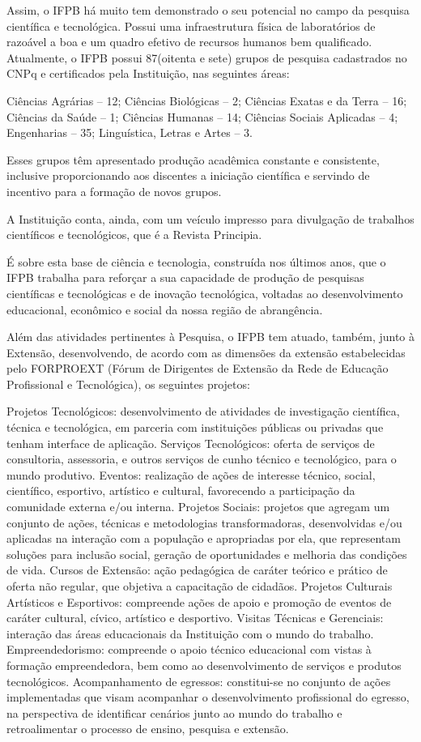 	Assim, o IFPB há muito tem demonstrado o seu potencial no campo da pesquisa científica e tecnológica. Possui uma infraestrutura física de laboratórios de razoável a boa e um quadro efetivo de recursos humanos bem qualificado. Atualmente, o IFPB possui 87(oitenta e sete) grupos de pesquisa cadastrados no CNPq e certificados pela Instituição, nas seguintes áreas: 
	
Ciências Agrárias – 12;
Ciências Biológicas – 2;
Ciências Exatas e da Terra – 16;
Ciências da Saúde – 1;
Ciências Humanas – 14;
Ciências Sociais Aplicadas – 4;
Engenharias – 35;
Linguística, Letras e Artes – 3.

	Esses grupos têm apresentado produção acadêmica constante e consistente, inclusive proporcionando aos discentes a iniciação científica e servindo de incentivo para a formação de novos grupos.
	
	A Instituição conta, ainda, com um veículo impresso para divulgação de trabalhos científicos e tecnológicos, que é a Revista Principia.
	
	É sobre esta base de ciência e tecnologia, construída nos últimos anos, que o IFPB trabalha para reforçar a sua capacidade de produção de pesquisas científicas e tecnológicas e de inovação tecnológica, voltadas ao desenvolvimento educacional, econômico e social da nossa região de abrangência.
	
	Além das atividades pertinentes à Pesquisa, o IFPB tem atuado, também, junto à Extensão, desenvolvendo, de acordo com as dimensões da extensão estabelecidas pelo FORPROEXT (Fórum de Dirigentes de Extensão da Rede de Educação Profissional e Tecnológica), os seguintes projetos:
	
Projetos Tecnológicos: desenvolvimento de atividades de investigação científica, técnica e tecnológica, em parceria com instituições públicas ou privadas que tenham interface de aplicação.
	Serviços Tecnológicos: oferta de serviços de consultoria, assessoria, e outros serviços de cunho técnico e tecnológico, para o mundo produtivo.
	Eventos: realização de ações de interesse técnico, social, científico, esportivo, artístico e cultural, favorecendo a participação da comunidade externa e/ou interna.
	Projetos Sociais: projetos que agregam um conjunto de ações, técnicas e metodologias transformadoras, desenvolvidas e/ou aplicadas na interação com a população e apropriadas por ela, que representam soluções para inclusão social, geração de oportunidades e melhoria das condições de vida.
	Cursos de Extensão: ação pedagógica de caráter teórico e prático de oferta não regular, que objetiva a capacitação de cidadãos.
	Projetos Culturais Artísticos e Esportivos: compreende ações de apoio e promoção de eventos de caráter cultural, cívico, artístico e desportivo.
	Visitas Técnicas e Gerenciais: interação das áreas educacionais da Instituição com o mundo do trabalho.
	Empreendedorismo: compreende o apoio técnico educacional com vistas à formação empreendedora, bem como ao desenvolvimento de serviços e produtos tecnológicos.
	Acompanhamento de egressos: constitui-se no conjunto de ações implementadas que visam acompanhar o desenvolvimento profissional do egresso, na perspectiva de identificar cenários junto ao mundo do trabalho e retroalimentar o processo de ensino, pesquisa e extensão.

